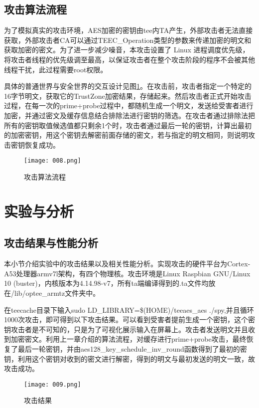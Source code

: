 \section{攻击算法流程}

为了模拟真实的攻击环境，AES加密的密钥由tee内TA产生，外部攻击者无法直接获取，外部攻击者CA可以通过TEEC\_Operation类型的参数来传递加密的明文和获取加密的密文。为了进一步减少噪音，本攻击设置了 Linux 进程调度优先级，将攻击者线程的优先级调至最高，以保证攻击者在整个攻击阶段的程序不会被其他线程干扰，此过程需要root权限。


具体的普通世界与安全世界的交互设计见图\ref{008}。在攻击前，攻击者指定一个特定的16字节明文，获取它的TrustZone加密结果，存储起来。然后攻击者正式开始攻击过程，在每一次的prime+probe过程中，都随机生成一个明文，发送给受害者进行加密，并通过密文及缓存信息结合排除法进行密钥的筛选。在攻击者通过排除法把所有的密钥取值候选值都只剩余1个时，攻击者通过最后一轮的密钥，计算出最初的加密密钥，用这个密钥去解密前面存储的密文，若与指定的明文相同，则说明攻击密钥恢复成功。

\begin{figure}[H]
	\centering
	\texttt{[image: 008.png]}
	\caption{攻击算法流程}
	\label{008}
\end{figure}




\chapter{实验与分析}
\section{攻击结果与性能分析}
本小节介绍实验中的攻击结果以及相关性能分析。实现攻击的硬件平台为Cortex-A53处理器armv7l架构，有四个物理核。攻击环境是Linux Raspbian GNU/Linux 10 (buster)，内核版本为4.14.98-v7，所有ta端编译得到的.ta文件均放在/lib/optee\_armtz文件夹中。

在teecache目录下输入sudo LD\_LIBRARY=\$(HOME)/teeaes\_aes ./spy,并且循环1000次攻击，即可得到以下攻击结果。可以看到受害者提前生成一个密钥，这个密钥攻击者是不可知的，只是为了可视化展示输入在屏幕上。攻击者发送明文并且收到加密密文。利用上一章介绍的算法流程，对缓存进行prime+probe攻击，最终恢复了最后一轮密钥，并由aes128\_key\_schedule\_inv\_round函数得到了最初的密钥，利用这个密钥对收到的密文进行解密，得到的明文与最初发送的明文一致，故攻击成功。


\begin{figure}[H]
	\centering
	\texttt{[image: 009.png]}
	\caption{攻击结果}
	\label{009}
\end{figure}



